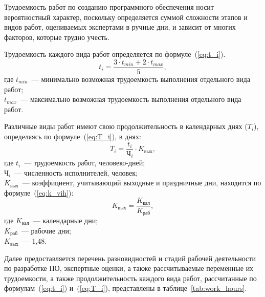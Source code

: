 Трудоемкость работ по созданию программного обеспечения носит вероятностный характер, поскольку определяется суммой сложности этапов и видов работ, оцениваемых экспертами в ручные дни, и зависит от многих факторов, которые трудно учесть.

Трудоемкость каждого вида работ определяется по формуле~(\ref{eq:t_i}).
\begin{equation}\label{eq:t_i}
	t_i=\frac{3 \cdot t_{min} + 2 \cdot t_{max}}{5},
\end{equation}
где $t_{min}$~--- минимально возможная трудоемкость выполнения отдельного вида работ; \\
$t_{max}$~--- максимально возможная трудоемкость выполнения отдельного вида
работ.

Различные виды работ имеют свою продолжительность в календарных днях ($T_{i}$), определяясь по формуле~(\ref{eq:T_i}), в днях:
\begin{equation}\label{eq:T_i}
	T_i=\frac{t_{i}}{\text{Ч}_{i}} \cdot K_{\text{вых}},
\end{equation}
где $t_{i}$~--- трудоемкость работ, человеко-дней; \\
$\text{Ч}_{i}$~--- численность исполнителей, человек; \\
$K_{\text{вых}}$~--- коэффициент, учитывающий выходные и праздничные дни, находится по формуле~(\ref{eq:k_vih}):
\begin{equation}\label{eq:k_vih}
	K_{\text{вых}}=\frac{K_{\text{кал}}}{K_{\text{раб}}},
\end{equation}
где $K_{\text{кал}}$~--- календарные дни; \\
$K_{\text{раб}}$~--- рабочие дни; \\
$K_{\text{вых}}$~--- 1,48.

Далее предоставляется перечень разновидностей и стадий рабочей деятельности по разработке ПО, экспертные оценки, а также рассчитываемые переменные их трудоемкости, а также продолжительность каждого вида работ, рассчитанные по формулам~(\ref{eq:t_i}) и~(\ref{eq:T_i}), представлены в таблице~\ref{tab:work_hours}.


